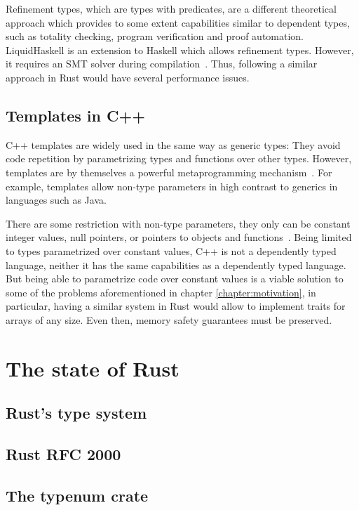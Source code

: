 Refinement types, which are types with predicates, are a different theoretical
approach which provides to some extent capabilities similar to dependent types,
such as totality checking, program verification and proof automation.
LiquidHaskell is an extension to Haskell which allows refinement types. However,
it requires an SMT solver during compilation~\cite{liquidhaskell}. Thus,
following a similar approach in Rust would have several performance issues.

\subsection{Templates in C++} 

C++ templates are widely used in the same way as generic types: They avoid code
repetition by parametrizing types and functions over other types. However,
templates are by themselves a powerful metaprogramming
mechanism~\cite{template_metaprogramming}. For example, templates allow non-type
parameters in high contrast to generics in languages such as Java.

There are some restriction with non-type parameters, they only can be constant
integer values, null pointers, or pointers to objects and
functions~\cite{templates}. Being limited to types parametrized over constant
values, C++ is not a dependently typed language, neither it has the same
capabilities as a dependently typed language. But being able to parametrize code
over constant values is a viable solution to some of the problems aforementioned
in chapter \ref{chapter:motivation}, in particular, having a similar system in
Rust would allow to implement traits for arrays of any size. Even then, memory
safety guarantees must be preserved.

\section{The state of Rust} 

\subsection{Rust's type system} 

\subsection{Rust RFC 2000} 

\subsection{The typenum crate}
